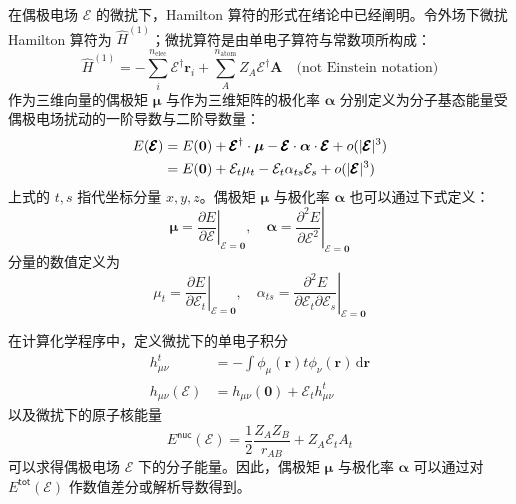 在偶极电场 $\pmb{\mathcal{E}}$ 的微扰下，Hamilton 算符的形式\alert{在绪论中}已经阐明。令外场下微扰 Hamilton 算符为 $\hat H^{(1)}$；微扰算符是由单电子算符与常数项所构成：
\begin{equation}
  \label{eq.electric-perturbed-hamiltonian}
  \hat H^{(1)} = - \sum_i^{n_\mathrm{elec}} \pmb{\mathcal{E}}^\dagger \bm{r}_i + \sum_{A}^{n_\mathrm{atom}} Z_A \pmb{\mathcal{E}}^\dagger \bm{A} \quad \text{(not Einstein notation)}
\end{equation}
作为三维向量的偶极矩 $\bm{\mu}$ 与作为三维矩阵的极化率 $\bm{\alpha}$ 分别定义为分子基态能量受偶极电场扰动的一阶导数与二阶导数量\cite{Atkins-Friedman.Oxford.2011}：
\begin{align}
  E(\pmb{\mathcal{E}}) &= E(\bm{0}) + \pmb{\mathcal{E}}^\dagger \cdot \bm{\mu} - \pmb{\mathcal{E}} \cdot \bm{\alpha} \cdot \pmb{\mathcal{E}} + o(|\pmb{\mathcal{E}}|^3) \notag\\
  &= E(\bm{0}) + \mathcal{E}_t \mu_t - \mathcal{E}_t \alpha_{ts} \mathcal{E}_s + o(|\pmb{\mathcal{E}}|^3)
\end{align}
上式的 $t, s$ 指代坐标分量 $x, y, z$。偶极矩 $\bm{\mu}$ 与极化率 $\bm{\alpha}$ 也可以通过下式定义：
\begin{equation}
  \bm{\mu} = \left. \frac{\partial E}{\partial \pmb{\mathcal{E}}} \right|_{\pmb{\mathcal{E}} = \bm{0}}, \quad
  \bm{\alpha} = \left. \frac{\partial^2 E}{\partial \pmb{\mathcal{E}}^2} \right|_{\pmb{\mathcal{E}} = \bm{0}}
\end{equation}
分量的数值定义为
\begin{equation}
  \mu_t = \left. \frac{\partial E}{\partial \mathcal{E}_t} \right|_{\pmb{\mathcal{E}} = \bm{0}}, \quad
  \alpha_{ts} = \left. \frac{\partial^2 E}{\partial \mathcal{E}_t \partial \mathcal{E}_s} \right|_{\pmb{\mathcal{E}} = \bm{0}}
\end{equation}

在计算化学程序中，定义微扰下的单电子积分
\begin{align}
  h_{\mu \nu}^{t} &= - \int \phi_\mu (\bm{r}) t \phi_\nu (\bm{r}) \, \mathrm{d} \bm{r} \\
  \label{eq.def.huv-with-perturb}
  h_{\mu \nu} (\pmb{\mathcal{E}}) &= h_{\mu \nu} (\bm{0}) + \mathcal{E}_t h_{\mu \nu}^t
\end{align}
以及微扰下的原子核能量
\begin{equation}
  E^\textsf{nuc} (\pmb{\mathcal{E}}) = \frac{1}{2} \frac{Z_A Z_B}{r_{AB}} + Z_A \mathcal{E}_t A_t
\end{equation}
可以求得偶极电场 $\pmb{\mathcal{E}}$ 下的分子能量。因此，偶极矩 $\bm{\mu}$ 与极化率 $\bm{\alpha}$ 可以通过对 $E^\textsf{tot} (\pmb{\mathcal{E}})$ 作数值差分或解析导数得到。

